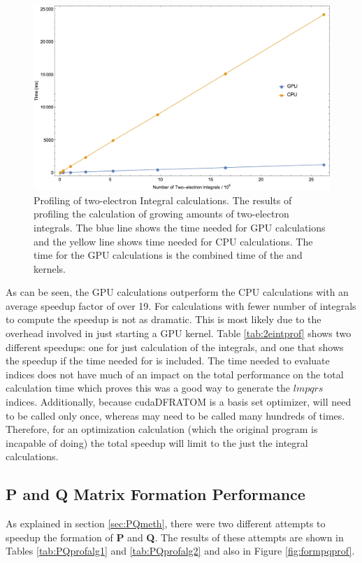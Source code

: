 \begin{figure}[h!]
\includegraphics[width=1\textwidth]{Figures/eint2prof.png}
\caption[Profiling of two-electron integral calculations]
{Profiling of two-electron Integral calculations. The results of profiling the calculation of growing amounts of two-electron integrals. The blue line shows the time needed for GPU calculations and the yellow line shows time needed for CPU calculations. The time for the GPU calculations is the combined time of the  and  kernels.}
\label{fig:2eintprof}
\end{figure}

As can be seen, the GPU calculations outperform the CPU calculations with an average speedup factor of over 19. For calculations with fewer number of integrals to compute the speedup is not as dramatic. This is most likely due to the overhead involved in just starting a GPU kernel. Table \ref{tab:2eintprof} shows two different speedups: one for just calculation of the integrals, and one that shows the speedup if the time needed for  is included. The time needed to evaluate indices does not have much of an impact on the total performance on the total calculation time which proves this was a good way to generate the $lmpqrs$ indices. Additionally, because cudaDFRATOM is a basis set optimizer,  will need to be called only once, whereas  may need to be called many hundreds of times. Therefore, for an optimization calculation (which the original program is incapable of doing) the total speedup will limit to the just the integral calculations.

\subsection{P and Q Matrix Formation Performance}
As explained in section \ref{sec:PQmeth}, there were two different attempts to speedup the formation of \textbf{P} and \textbf{Q}. The results of these attempts are shown in Tables \ref{tab:PQprofalg1} and \ref{tab:PQprofalg2} and also in Figure \ref{fig:formpqprof}.

